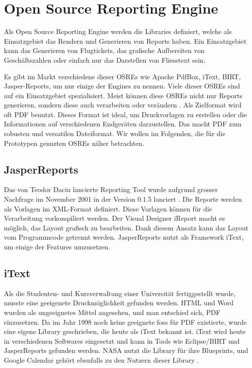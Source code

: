 \documentclass[main.tex]{subfiles}
\begin{document}
\section{Open Source Reporting Engine }



Als Open Source Reporting Engine werden die Libraries definiert, welche als Einsatzgebiet das Rendern und Generieren von Reports haben. Ein Einsatzgebiet kann das Generieren von Flugtickets, das grafische Aufbereiten von Geschäftszahlen oder einfach nur das Darstellen von Fliesstext sein.

Es gibt im Markt verschiedene dieser OSREs wie Apache PdfBox, iText, BIRT, Jasper-Reports, um nur einige der Engines zu nennen. Viele dieser OSREs sind auf ein Einsatzgebiet spezialisiert. Meist können diese OSREs nicht nur Reports generieren, sondern diese auch verarbeiten oder verändern \cite[Kap. ~10]{whitington_2012}. Als Zielformat wird oft PDF benutzt. Dieses Format ist ideal, um Druckvorlagen zu erstellen oder die Informationen auf verschiedenen Endgeräten darzustellen. Das macht PDF zum robusten und versatilen Dateiformat. Wir wollen im Folgenden, die für die Prototypen genuzten OSREs näher betrachten.


\subsection{JasperReports\textregistered}
Das von Teodor Daciu lancierte Reporting Tool wurde aufgrund grosser Nachfrage im November 2001 in der Version 0.1.5 lanciert \cite[Kap.~1]{heffelfinger_2009}. Die Reporte werden als Vorlagen im XML-Format definiert. Diese Vorlagen können für die Verarbeitung vorkompiliert werden. Der Visual Designer iReport macht es möglich, das Layout grafisch zu bearbeiten. Dank diesem Ansatz kann das Layout vom Programmcode getrennt werden. JasperReports nutzt als Framework iText, um einige der Features umzusetzen. 


\subsection{iText}
Als die Studenten- und Kursverwaltung einer Universität fertiggestellt wurde, musste eine geeigenete Druckmöglichkeit gefunden werden. HTML und Word wurden als ungeeignetes Mittel angesehen, und man entschied sich, PDF einzusetzen. Da im Jahr 1998 noch keine geeignete \acrshort{foss} für PDF existierte, wurde eine eigene Library geschrieben, die heute als iText bekannt ist. iText wird heute in verschiedenen Softwares eingesetzt und kann in Tools wie Eclipse/BIRT und JasperReports gefunden werden. NASA nutzt die Library für ihre Blueprints, und Google Calendar gehört ebenfalls zu den Nutzern dieser Library \cite[Kap.~1]{itexthistory}.
\end{document}
